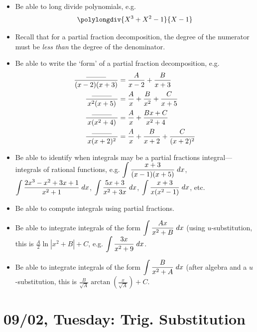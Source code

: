 \documentclass[11pt,letterpaper]{article}
\begin{document}
\begin{itemize}
\item Be able to long divide polynomials, e.g.
	\[
	\polylongdiv{X^3+X^2-1}{X-1}
	\]

\item Recall that for a partial fraction decomposition, the degree of the numerator must be \textit{less than} the degree of the denominator.

\item Be able to write the `form' of a partial fraction decomposition, e.g.
	\[
	\begin{aligned}
	\dfrac{\;\;\;\rule{1cm}{0.3pt}\;\;\;}{(x - 2)(x + 3)}&= \dfrac{A}{x - 2} + \dfrac{B}{x + 3} \\
	\dfrac{\;\;\;\rule{1cm}{0.3pt}\;\;\;}{x^2(x + 5)}&= \dfrac{A}{x} + \dfrac{B}{x^2} + \dfrac{C}{x + 5} \\
	\dfrac{\;\;\;\rule{1cm}{0.3pt}\;\;\;}{x(x^2 + 4)}&= \dfrac{A}{x} + \dfrac{Bx + C}{x^2 + 4} \\
	\dfrac{\;\;\;\rule{1cm}{0.3pt}\;\;\;}{x(x + 2)^2}&= \dfrac{A}{x} + \dfrac{B}{x + 2} + \dfrac{C}{(x + 2)^2}
	\end{aligned}
	\]

\item Be able to identify when integrals may be a partial fractions integral---integrals of rational functions, e.g. $\displaystyle\int \dfrac{x + 3}{(x - 1)(x + 5)} \;dx$, $\displaystyle\int \dfrac{2x^3 - x^2 + 3x + 1}{x^2 + 1} \;dx$, $\displaystyle\int \dfrac{5x + 3}{x^2 + 3x} \;dx$, $\displaystyle\int \dfrac{x + 3}{x(x^2 - 1)} \;dx$, etc. 

\item Be able to compute integrals using partial fractions. 

\item Be able to integrate integrals of the form $\displaystyle\int \dfrac{Ax}{x^2 + B} \;dx$ (using $u$-substitution, this is $\tfrac{A}{2} \ln|x^2 + B| + C$, e.g. $\displaystyle\int \dfrac{3x}{x^2 + 9} \;dx$.

\item Be able to integrate integrals of the form $\displaystyle\int \dfrac{B}{x^2 + A} \;dx$ (after algebra and a $u$-substitution, this is $\tfrac{B}{\sqrt{A}} \arctan\left( \tfrac{x}{\sqrt{A}} \right) + C$.
\end{itemize}

\newpage
\section*{09/02, Tuesday: Trig. Substitution\label{09-02}}
\end{document}
